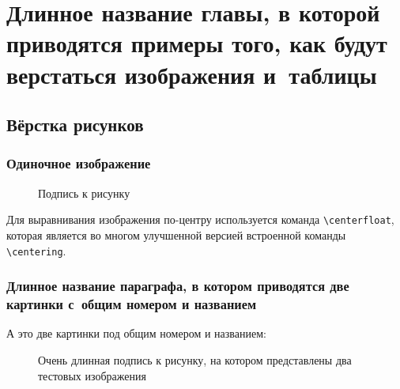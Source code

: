 \chapter{Длинное название главы, в которой приводятся примеры того, 
как будут верстаться изображения и~таблицы}\label{ch:ch2}

\section{Вёрстка рисунков}\label{sec:ch2/sec1}

\subsection{Одиночное изображение}\label{sub:ch2/sec1/sub1}

\begin{figure}[htbp]
    \caption{Подпись к рисунку}\label{fig:1}
\end{figure}

Для выравнивания изображения по-центру используется команда 
\verb+\centerfloat+, которая является во многом улучшенной версией 
встроенной команды \verb+\centering+.



\subsection{Длинное название параграфа, в котором приводятся две 
картинки с~общим номером и названием}\label{sub:ch2/sec1/sub2}

А это две картинки под общим номером и названием:
\begin{figure}[htbp]
    \caption{Очень длинная подпись к рисунку,
        на котором представлены два тестовых изображения}
    \label{fig:2}
\end{figure}


